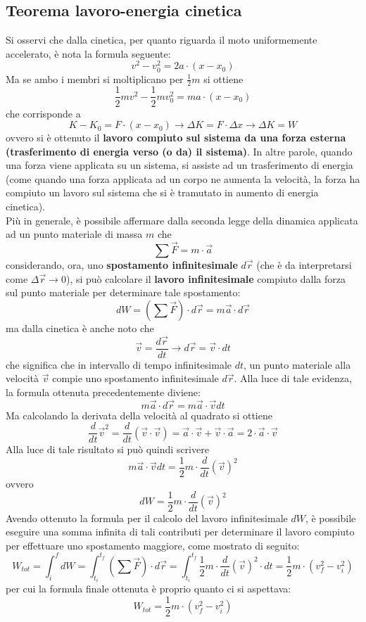 \documentclass[a4paper]{extarticle}
\begin{document}
\subsection{Teorema lavoro-energia cinetica}
Si osservi che dalla cinetica, per quanto riguarda il moto uniformemente accelerato, è nota la formula seguente:
\[v^2 - v_0^2 = 2a \cdot (x-x_0)\]
Ma se ambo i membri si moltiplicano per $\frac{1}{2}m$ si ottiene
\[\frac{1}{2} m v^2 - \frac{1}{2} m v_0^2 = ma \cdot (x-x_0)\]
che corrisponde a
\[K - K_0 = F \cdot (x-x_0) \longrightarrow \Delta K = F \cdot \Delta x \longrightarrow \Delta K = W\]
ovvero si è ottenuto il \textbf{lavoro compiuto sul sistema da una forza esterna (trasferimento di energia verso (o da) il sistema)}. In altre parole, quando una forza viene applicata su un sistema, si assiste ad un trasferimento di energia (come quando una forza applicata ad un corpo ne aumenta la velocità, la forza ha compiuto un lavoro sul sistema che si è tramutato in aumento di energia cinetica).\\
Più in generale, è possibile affermare dalla seconda legge della dinamica applicata ad un punto materiale di massa $m$ che
\[\sum \vec F = m \cdot \vec a\]
considerando, ora, uno \textbf{spostamento infinitesimale} $d \vec r$ (che è da interpretarsi come $\Delta \vec r \rightarrow 0$), si può calcolare il \textbf{lavoro infinitesimale} compiuto dalla forza sul punto materiale per determinare tale spostamento:
\[dW = \left(\sum \vec F\right) \cdot d \vec r = m \vec a \cdot d \vec r\]
ma dalla cinetica è anche noto che
\[\vec v = \frac{d \vec r}{d t} \longrightarrow d \vec r = \vec v \cdot dt\]
che significa che in intervallo di tempo infinitesimale $dt$, un punto materiale alla velocità $\vec v$ compie uno spostamento infinitesimale $d \vec r$. Alla luce di tale evidenza, la formula ottenuta precedentemente diviene:
\[m \vec a \cdot d \vec r = m \vec a \cdot \vec v dt\]
Ma calcolando la derivata della velocità al quadrato si ottiene
\[\frac{d}{dt} \vec v^2 = \frac{d}{dt} \left(\vec v \cdot \vec v\right) = \vec a \cdot \vec v + \vec v \cdot \vec a = 2 \cdot \vec a \cdot \vec v\]
Alla luce di tale risultato si può quindi scrivere
\[m \vec a \cdot \vec v dt = \frac{1}{2}m \cdot \frac{d}{dt} (\vec v)^2\]
ovvero
\[\boxed{dW = \frac{1}{2}m \cdot \frac{d}{dt} (\vec v)^2}\]
Avendo ottenuto la formula per il calcolo del lavoro infinitesimale $dW$, è possibile eseguire una somma infinita di tali contributi per determinare il lavoro compiuto per effettuare uno spostamento maggiore, come mostrato di seguito:
\[W_{tot} = \int_i^f dW = \int_{t_i}^{t_f} \left(\sum \vec F\right) \cdot d \vec{r} = \int_{t_i}^{t_f} \frac{1}{2}m \cdot \frac{d}{dt} (\vec v)^2 \cdot dt = \frac{1}{2}m \cdot \left(v_f^2 - v_i^2\right)\]
per cui la formula finale ottenuta è proprio quanto ci si aspettava:
\[\boxed{W_{tot} = \frac{1}{2}m \cdot \left(v_f^2 - v_i^2\right)}\]
\end{document}
